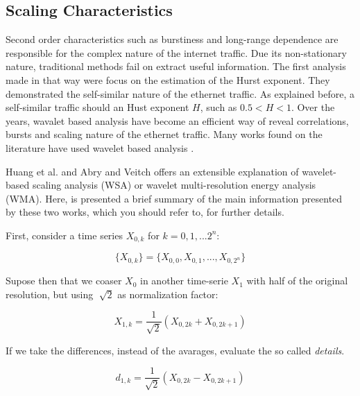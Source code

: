 \subsection{Scaling Characteristics}

Second order characteristics such as burstiness and long-range dependence are responsible for the complex nature of the internet traffic\cite{validate-trafficgen}. Due its non-stationary nature, traditional methods fail on extract useful information\cite{validate-trafficgen}. The first analysis made in that way were focus on the estimation of the Hurst exponent\cite{selfsimilar-ethernet}. They demonstrated the self-similar nature of the ethernet traffic. As explained before, a self-similar traffic should an Hust exponent $H$, such as $ 0.5 < H < 1$. Over the years, wavalet based analysis have become an efficient way of reveal correlations, bursts and scaling  nature of the ethernet traffic\cite{validate-trafficgen}. Many works found on the literature have used wavelet based analysis \cite{swing-paper}\cite{non-intrusive-wavelet}\cite{wavelet-analysis-long-range}. 

Huang et al. \cite{non-intrusive-wavelet} and Abry and Veitch \cite{wavelet-analysis-long-range} offers an extensible explanation of  wavelet-based scaling analysis (WSA) or wavelet multi-resolution energy analysis (WMA). Here, is presented a brief summary of the main information presented by these two works, which you should refer to, for further details. 

First, consider a time series $X_{0,k}$ for $k = 0, 1, ... 2^n$:

\begin{equation}
\{X_{0,k}\} = \{ X_{0,0}, X_{0,1}, ... ,X_{0,2^{n}} \}
\end{equation} 

Supose then that we coaser $X_{0}$ in another time-serie $X_{1}$ with half of the original resolution, but using  $ \sqrt[]{2} $  as normalization factor:

\begin{equation}
X_{1,k} = \frac{1}{\sqrt{2}}(X_{0,2k} + X_{0,2k+1})
\end{equation}

If we take the differences, instead of the avarages, evaluate the so called \textit{details}. 

\begin{equation}
d_{1,k} = \frac{1}{\sqrt{2}}(X_{0,2k} - X_{0,2k+1})
\end{equation}


